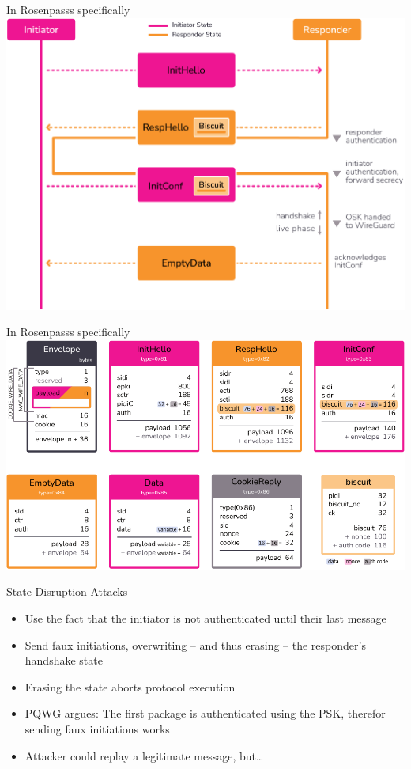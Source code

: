 \begin{frame}{In Rosenpasss specifically}
  \includegraphics[height=.80\textheight]{graphics/rosenpass-wp-key-exchange-protocol.pdf}
\end{frame}

\begin{frame}{In Rosenpasss specifically}
  \includegraphics[height=.80\textheight]{graphics/rosenpass-wp-message-types.pdf}
\end{frame}

\begin{frame}{State Disruption Attacks}
\begin{itemize}
  \item Use the fact that the initiator is not authenticated until their last message
  \item Send faux initiations, overwriting – and thus erasing – the responder's handshake state
  \item Erasing the state aborts protocol execution
  \item PQWG argues: The first package is authenticated using the PSK, therefor sending faux initiations works
  \item Attacker could replay a legitimate message, but…
\end{itemize}
\end{frame}


